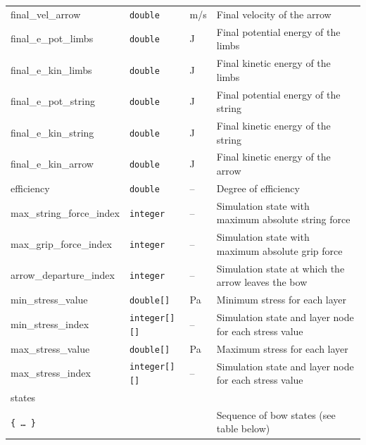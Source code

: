 \documentclass[12pt]{article}
\begin{document}
\begin{table}[H]
{\begin{tabular}{ l | l | l | l }
\quad final\_vel\_arrow & \texttt{double} & \unit[]{m/s} & Final velocity of the arrow \\
\quad final\_e\_pot\_limbs & \texttt{double} & \unit[]{J} & Final potential energy of the limbs \\
\quad final\_e\_kin\_limbs & \texttt{double} & \unit[]{J} & Final kinetic energy of the limbs \\
\quad final\_e\_pot\_string & \texttt{double} & \unit[]{J} & Final potential energy of the string \\
\quad final\_e\_kin\_string & \texttt{double} & \unit[]{J} & Final kinetic energy of the string \\
\quad final\_e\_kin\_arrow & \texttt{double} & \unit[]{J} & Final kinetic energy of the arrow \\
\quad efficiency & \texttt{double} & -- & Degree of efficiency \\
\quad max\_string\_force\_index & \texttt{integer} & -- & Simulation state with maximum absolute string force \\
\quad max\_grip\_force\_index & \texttt{integer} & -- & Simulation state with maximum absolute grip force \\
\quad arrow\_departure\_index & \texttt{integer} & -- & Simulation state at which the arrow leaves the bow \\
\quad min\_stress\_value & \texttt{double[]} & \unit[]{Pa} & Minimum stress for each layer \\
\quad min\_stress\_index & \texttt{integer[][]} & -- & Simulation state and layer node for each stress value \\
\quad max\_stress\_value & \texttt{double[]} & \unit[]{Pa} & Maximum stress for each layer \\
\quad max\_stress\_index & \texttt{integer[][]} & -- & Simulation state and layer node for each stress value \\
\quad states & & & \\
\quad\quad \texttt{\{\ \ldots\ \}} & & & Sequence of bow states (see table below) \\
\end{tabular}}
\end{table}
\end{document}
